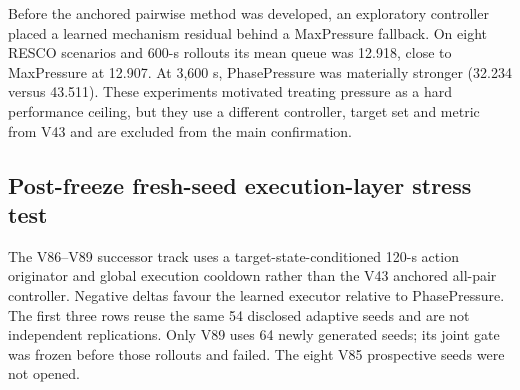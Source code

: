 Before the anchored pairwise method was developed, an exploratory controller
placed a learned mechanism residual behind a MaxPressure fallback.  On eight
RESCO scenarios and 600-s rollouts its mean queue was 12.918, close to
MaxPressure at 12.907.  At 3,600 s, PhasePressure was materially stronger
(32.234 versus 43.511).  These experiments motivated treating pressure as a
hard performance ceiling, but they use a different controller, target set and
metric from V43 and are excluded from the main confirmation.

\begin{table}[htbp]
\caption{Exploratory 600-s pressure-guard stress test retained for development
transparency.  This is not the final anchored CFCMT controller.}
\label{tab:discarded-guard-600}
\centering
\scriptsize
\resizebox{\textwidth}{!}{}
\end{table}

\begin{table}[htbp]
\caption{Exploratory 3,600-s pressure-guard boundary check.  PhasePressure is
the strongest policy in this discarded protocol.}
\label{tab:discarded-guard-3600}
\centering
\scriptsize
\resizebox{\textwidth}{!}{}
\end{table}

\subsection{Post-freeze fresh-seed execution-layer stress test}
\label{sec:supp-postfreeze-stress}

The V86--V89 successor track uses a target-state-conditioned 120-s action
originator and global execution cooldown rather than the V43 anchored all-pair
controller.  Negative deltas favour the learned executor relative to
PhasePressure.  The first three rows reuse the same 54 disclosed adaptive seeds
and are not independent replications.  Only V89 uses 64 newly generated seeds; its
joint gate was frozen before those rollouts and failed.  The eight V85
prospective seeds were not opened.

\begin{table}[htbp]
\caption{Post-freeze Jinan execution-layer stress test.  Intervals are paired
simulator-seed bootstrap intervals.  Development rows are shown to expose the
adaptive-to-confirmatory shrinkage and are not pooled with V89.}
\label{tab:postfreeze-stress}
\centering
\scriptsize
\resizebox{\textwidth}{!}{}
\end{table}

